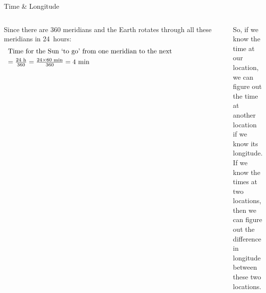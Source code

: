\begin{myFrame}{Time \& Longitude}{}
\begin{columns}[t]
%
\setCol  
\begin{itemize} 
\col Since there are 360 meridians and the Earth rotates through all these meridians in 24~hours:
\remSpace\scriptsize  \color{myBrown}
\[
\begin{array}{ll}
\parbox{0.9\linewidth}{{Time for the Sun `to go' from one meridian to the next}} \st
= \frac{24\text{ h}}{360} = \frac{24\times60 \text{ min}}{360} = 4\text{ min}
\end{array}
\]
\end{itemize}
\begin{itemize}
\col So, if we know the time at our location, we can figure out the time at another location if we know its longitude.
\col If we know the times at two locations, then we can figure out the difference in longitude between these two locations.
\end{itemize}
\end{columns}
\bigskip

\end{myFrame}





